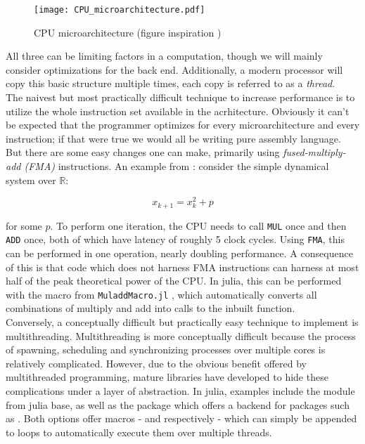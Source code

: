 \begin{figure}[ht]
    \centering
    \texttt{[image: CPU\_microarchitecture.pdf]}
    \caption{CPU microarchitecture (figure inspiration \cite*{solvercomp, uops.info})}
    \label{fig:CPU}
\end{figure}

All three can be limiting factors in a computation, though we will mainly consider 
optimizations for the back end. Additionally, a modern processor will copy this basic 
structure multiple times, each copy is referred to as a \emph{thread}. \\

The naivest but most practically difficult technique to increase performance is to utilize 
the whole instruction set available in the acrhitecture. Obviously it can't be expected 
that the programmer optimizes for every microarchitecture and every instruction; if that were 
true we would all be writing pure assembly language. But there are some easy changes one 
can make, primarily using \emph{fused-multiply-add (FMA)} instructions. An example from 
\cite*{solvercomp}: consider the simple dynamical system over $\mathbb{R}$:

\begin{equation}{}
    x_{k+1} = x_k^2 + p
\end{equation}

for some $p$. To perform one iteration, the CPU needs to call \texttt{MUL} once and then 
\texttt{ADD} once, both of which have latency of roughly 5 clock cycles. Using 
\texttt{FMA}, this can be performed in one operation, nearly doubling performance. A 
consequence of this is that code which does not harness FMA instructions can harness at 
most half of the peak theoretical power of the CPU. In julia, this can be performed with 
the  macro from \texttt{MuladdMacro.jl} 
\cite*{muladd}, which automatically converts all combinations of multiply and add into 
calls to the inbuilt  function. \\

Conversely, a conceptually difficult but practically easy technique to implement is 
multithreading. Multithreading is more conceptually difficult because the process of 
spawning, scheduling and synchronizing processes over multiple cores is relatively 
complicated. However, due to the obvious benefit offered by multithreaded programming, 
mature libraries have developed to hide these complications under a layer of abstraction. 
In julia, examples include the  module from julia base, as well as the 
package  \cite*{transducers} which offers a backend for packages 
such as  \cite*{floops}. Both options offer macros - 
 and  respectively - which can simply be appended to 
 loops to automatically execute them over multiple threads. \\

